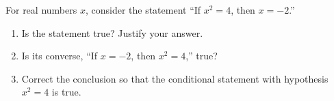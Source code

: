 For real numbers $x$, consider the statement ``If $x^2=4$, then $x=-2$.''
\begin{enumerate}
\item[(a)] Is the statement true? Justify your answer.
\item[(b)] Is its converse, ``If $x=-2$, then $x^2=4$,'' true?
\item[(c)] Correct the conclusion so that the conditional statement with hypothesis $x^2=4$ is true.
\end{enumerate}
